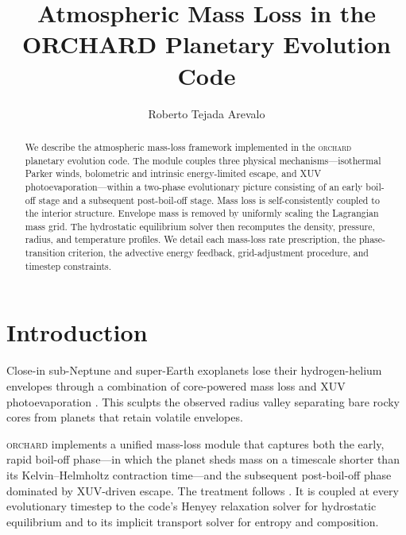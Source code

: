 \documentclass{aastex701}
\newcommand{\orchard}{\textsc{orchard}}
\begin{document}
\title{Atmospheric Mass Loss in the ORCHARD Planetary Evolution Code}

\author{Roberto Tejada Arevalo}

\begin{abstract}
We describe the atmospheric mass-loss framework implemented in the
\orchard{} planetary evolution code.  The module couples three physical
mechanisms---isothermal Parker winds, bolometric and intrinsic
energy-limited escape, and XUV photoevaporation---within a two-phase
evolutionary picture consisting of an early boil-off stage and a
subsequent post-boil-off stage.  Mass loss is self-consistently coupled
to the interior structure.  Envelope mass is removed by uniformly scaling
the Lagrangian mass grid.  The hydrostatic equilibrium solver then
recomputes the density, pressure, radius, and temperature profiles.  We
detail each mass-loss rate prescription, the phase-transition criterion,
the advective energy feedback, grid-adjustment procedure, and
timestep constraints.
\end{abstract}


\section{Introduction}\label{sec:intro}

Close-in sub-Neptune and super-Earth exoplanets lose their
hydrogen-helium envelopes through a combination of core-powered mass
loss \citep{Ginzburg2016, Gupta2019} and XUV photoevaporation
\citep{Lopez2013, Owen2017}.  This sculpts the observed radius valley
separating bare rocky cores from planets that retain volatile envelopes.

\orchard{} implements a unified mass-loss module that captures both
the early, rapid boil-off phase---in which the planet sheds mass on a
timescale shorter than its Kelvin--Helmholtz contraction
time---and the subsequent post-boil-off phase dominated by XUV-driven
escape.  The treatment follows \citet{Tang2024}.  It is coupled at every
evolutionary timestep to the code's Henyey relaxation solver for
hydrostatic equilibrium and to its implicit transport solver for entropy
and composition.
\end{document}
